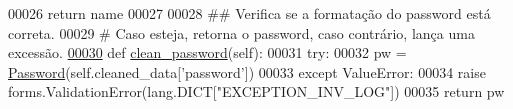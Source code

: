 \begin{DoxyCode}
00026         \textcolor{keywordflow}{return} name
00027 
00028     \textcolor{comment}{## Verifica se a formatação do password está correta.}
00029     \textcolor{comment}{# Caso esteja, retorna o password, caso contrário, lança uma excessão.}
\hypertarget{Login_2forms_8py_source_l00030}{}\hyperlink{classLogin_1_1forms_1_1LoginForm_ab3bf974521ccb331a02ca80ff62c8794}{00030}     \textcolor{keyword}{def }\hyperlink{classLogin_1_1forms_1_1LoginForm_ab3bf974521ccb331a02ca80ff62c8794}{clean\_password}(self):
00031         \textcolor{keywordflow}{try}:
00032             pw = \hyperlink{classELO_1_1BaseUnit_1_1Password}{Password}(self.cleaned\_data[\textcolor{stringliteral}{'password'}])
00033         \textcolor{keywordflow}{except} ValueError:
00034             \textcolor{keywordflow}{raise} forms.ValidationError(lang.DICT[\textcolor{stringliteral}{"EXCEPTION\_INV\_LOG"}])
00035         \textcolor{keywordflow}{return} pw
\end{DoxyCode}
